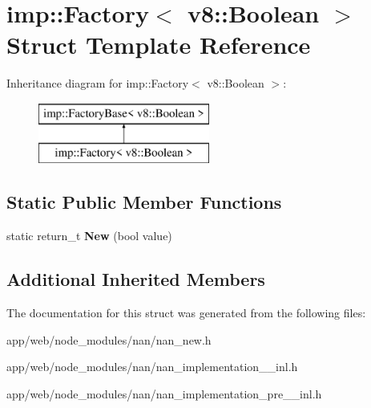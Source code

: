 \hypertarget{structimp_1_1_factory_3_01v8_1_1_boolean_01_4}{}\section{imp\+:\+:Factory$<$ v8\+:\+:Boolean $>$ Struct Template Reference}
\label{structimp_1_1_factory_3_01v8_1_1_boolean_01_4}
Inheritance diagram for imp\+:\+:Factory$<$ v8\+:\+:Boolean $>$\+:\begin{figure}[H]
\begin{center}
\leavevmode
\includegraphics[height=2.000000cm]{structimp_1_1_factory_3_01v8_1_1_boolean_01_4}
\end{center}
\end{figure}
\subsection*{Static Public Member Functions}
\begin{DoxyCompactItemize}
\item 
\mbox{\label{structimp_1_1_factory_3_01v8_1_1_boolean_01_4_a004d7fdc896eeb43d12cc82047c7172a}} 
static return\+\_\+t {\bfseries New} (bool value)
\end{DoxyCompactItemize}
\subsection*{Additional Inherited Members}


The documentation for this struct was generated from the following files\+:\begin{DoxyCompactItemize}
\item 
app/web/node\+\_\+modules/nan/nan\+\_\+new.\+h\item 
app/web/node\+\_\+modules/nan/nan\+\_\+implementation\+\_\+\_\+inl.\+h\item 
app/web/node\+\_\+modules/nan/nan\+\_\+implementation\+\_\+pre\+\_\+\_\+inl.\+h\end{DoxyCompactItemize}
